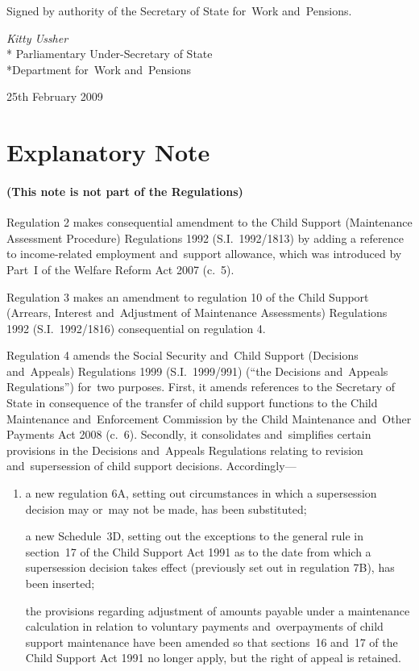 \documentclass[12pt,a4paper]{article}
\begin{document}
\bigskip

Signed 
by authority of the 
Secretary of State for~Work and~Pensions.

{\raggedleft
\emph{Kitty Ussher}\\*
Parliamentary Under-Secretary 
of State\\*Department 
for~Work and~Pensions

}

25th February 2009

\small

\part{Explanatory Note}

\renewcommand\parthead{— Explanatory Note}

\subsection*{(This note is not part of the Regulations)}

Regulation 2 makes consequential amendment to the Child Support (Maintenance Assessment Procedure) Regulations 1992 (S.I.~1992/1813) by adding a reference to income-related employment and~support allowance, which was introduced by Part~I of the Welfare Reform Act 2007 (c.~5).

Regulation 3 makes an amendment to regulation 10 of the Child Support (Arrears, Interest and~Adjustment of Maintenance Assessments) Regulations 1992 (S.I.~1992/1816) consequential on regulation 4.

Regulation 4 amends the Social Security and~Child Support (Decisions and~Appeals) Regulations 1999 (S.I.~1999/991) (“the Decisions and~Appeals Regulations”) for~two purposes. First, it amends references to the Secretary of State in consequence of the transfer of child support functions to the Child Maintenance and~Enforcement Commission by the Child Maintenance and~Other Payments Act 2008 (c.~6). Secondly, it consolidates and~simplifies certain provisions in the Decisions and~Appeals Regulations relating to revision and~supersession of child support decisions. Accordingly---
\begin{enumerate}\item[]
    a new regulation 6A, setting out circumstances in which a supersession decision may or~may not be made, has been substituted;

    a new Schedule~3D, setting out the exceptions to the general rule in section~17 of the Child Support Act 1991 as to the date from which a supersession decision takes effect (previously set out in regulation 7B), has been inserted;

    the provisions regarding adjustment of amounts payable under a maintenance calculation in relation to voluntary payments and~overpayments of child support maintenance have been amended so that sections~16 and~17 of the Child Support Act 1991 no longer apply, but the right of appeal is retained. 
\end{enumerate}
\end{document}
